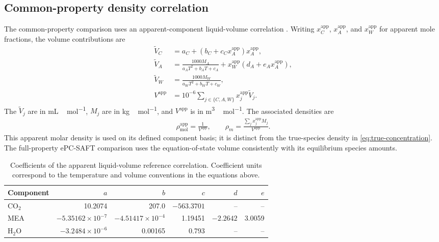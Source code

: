 \subsection{Common-property density correlation}
The common-property comparison uses an apparent-component liquid-volume correlation \cite{Morgan2015}.
Writing $x_C^{\mathrm{app}}$, $x_A^{\mathrm{app}}$, and $x_W^{\mathrm{app}}$ for apparent mole fractions, the volume contributions are
\begin{align}
\widetilde V_C&=a_C+(b_C+c_Cx_A^{\mathrm{app}})x_A^{\mathrm{app}},\\
\widetilde V_A&=\frac{1000M_A}{a_AT^2+b_AT+c_A}
+x_W^{\mathrm{app}}(d_A+e_Ax_A^{\mathrm{app}}),\\
\widetilde V_W&=\frac{1000M_W}{a_WT^2+b_WT+c_W},\\
V^{\mathrm{app}}&=10^{-6}\sum_{j\in\{C,A,W\}}x_j^{\mathrm{app}}\widetilde V_j.
\end{align}
The $\widetilde V_j$ are in \unit{mL\,mol^{-1}}, $M_j$ are in \unit{kg\,mol^{-1}}, and $V^{\mathrm{app}}$ is in \unit{m^3\,mol^{-1}}.
The associated densities are
\begin{align}
\rho_{\mathrm{mol}}^{\mathrm{app}}=\frac1{V^{\mathrm{app}}},\qquad
\rho_m=\frac{\sum_jx_j^{\mathrm{app}}M_j}{V^{\mathrm{app}}}.
\end{align}
This apparent molar density is used on its defined component basis; it is distinct from the true-species density in \cref{eq:true-concentration}.
The full-property ePC-SAFT comparison uses the equation-of-state volume consistently with its equilibrium species amounts.

\begin{table}[pos=htbp]
\centering\small
\caption{Coefficients of the apparent liquid-volume reference correlation. Coefficient units correspond to the temperature and volume conventions in the equations above.}
\begin{tabular}{@{}lrrrrr@{}}
\toprule
Component & $a$ & $b$ & $c$ & $d$ & $e$\\
\midrule
CO$_2$ & 10.2074 & 207.0 & $-563.3701$ & -- & --\\
MEA & $-5.35162\times10^{-7}$ & $-4.51417\times10^{-4}$ & 1.19451 & $-2.2642$ & 3.0059\\
H$_2$O & $-3.2484\times10^{-6}$ & 0.00165 & 0.793 & -- & --\\
\bottomrule
\end{tabular}
\end{table}

